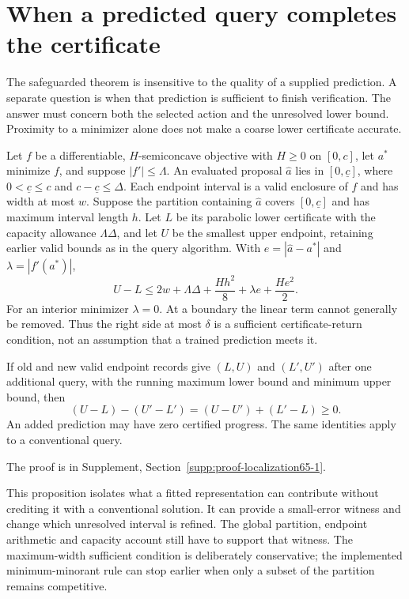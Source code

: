 \section{When a predicted query completes the certificate}\label{sec:localization65}
The safeguarded theorem is insensitive to the quality of a supplied prediction. A separate question is when that prediction is sufficient to finish verification. The answer must concern both the selected action and the unresolved lower bound. Proximity to a minimizer alone does not make a coarse lower certificate accurate.

\begin{proposition}\label{prop:localization65}
Let $f$ be a differentiable, $H$-semiconcave objective with $H\ge0$ on $[0,c]$, let $a^*$ minimize $f$, and suppose $|f'|\le\Lambda$. An evaluated proposal $\widehat a$ lies in $[0,\underline c]$, where $0<\underline c\le c$ and $c-\underline c\le\Delta$. Each endpoint interval is a valid enclosure of $f$ and has width at most $w$. Suppose the partition containing $\widehat a$ covers $[0,\underline c]$ and has maximum interval length $h$. Let $L$ be its parabolic lower certificate with the capacity allowance $\Lambda\Delta$, and let $U$ be the smallest upper endpoint, retaining earlier valid bounds as in the query algorithm. With $e=|\widehat a-a^*|$ and $\lambda=|f'(a^*)|$,
\begin{equation}\label{eq:localization65}
 U-L\le 2w+\Lambda\Delta+\frac{Hh^2}{8}
                         +\lambda e+\frac{He^2}{2}.
\end{equation}
For an interior minimizer $\lambda=0$. At a boundary the linear term cannot generally be removed. Thus the right side at most $\delta$ is a sufficient certificate-return condition, not an assumption that a trained prediction meets it.

If old and new valid endpoint records give $(L,U)$ and $(L',U')$ after one additional query, with the running maximum lower bound and minimum upper bound, then
\begin{equation}\label{eq:certificate-progress65}
 (U-L)-(U'-L')=(U-U')+(L'-L)\ge0.
\end{equation}
An added prediction may have zero certified progress. The same identities apply to a conventional query.
\end{proposition}
\noindent The proof is in Supplement, Section~\ref{supp:proof-localization65-1}.


This proposition isolates what a fitted representation can contribute without crediting it with a conventional solution. It can provide a small-error witness and change which unresolved interval is refined. The global partition, endpoint arithmetic and capacity account still have to support that witness. The maximum-width sufficient condition is deliberately conservative; the implemented minimum-minorant rule can stop earlier when only a subset of the partition remains competitive.

